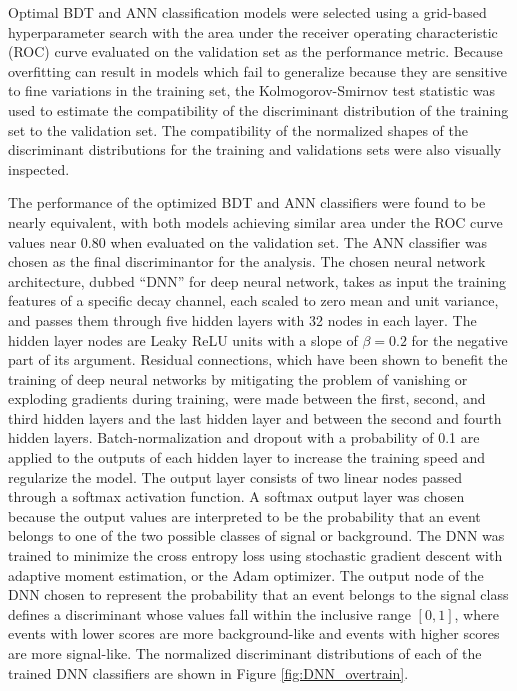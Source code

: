 Optimal BDT and ANN classification models were selected using a grid-based hyperparameter search with the area under the receiver operating characteristic (ROC) curve evaluated on the validation set as the performance metric. Because overfitting can result in models which fail to generalize because they are sensitive to fine variations in the training set, the Kolmogorov-Smirnov test statistic was used to estimate the compatibility of the discriminant distribution of the training set to the validation set. The compatibility of the normalized shapes of the discriminant distributions for the training and validations sets were also visually inspected.

The performance of the optimized BDT and ANN classifiers were found to be nearly equivalent, with both models achieving similar area under the ROC curve values near 0.80 when evaluated on the validation set. The ANN classifier was chosen as the final discriminantor for the analysis. The chosen neural network architecture, dubbed ``DNN'' for deep neural network, takes as input the training features of a specific decay channel, each scaled to zero mean and unit variance, and passes them through five hidden layers with 32 nodes in each layer. The hidden layer nodes are Leaky ReLU units with a slope of $\beta = 0.2$ for the negative part of its argument. Residual connections\cite{RESCONNECT}, which have been shown to benefit the training of deep neural networks by mitigating the problem of vanishing or exploding gradients during training, were made between the first, second, and third hidden layers and the last hidden layer and between the second and fourth hidden layers. Batch-normalization and dropout with a probability of 0.1 are applied to the outputs of each hidden layer to increase the training speed and regularize the model. The output layer consists of two linear nodes passed through a softmax activation function. A softmax output layer was chosen because the output values are interpreted to be the probability that an event belongs to one of the two possible classes of signal or background. The DNN was trained to minimize the cross entropy loss using stochastic gradient descent with adaptive moment estimation, or the Adam optimizer. The output node of the DNN chosen to represent the probability that an event belongs to the signal class defines a discriminant whose values fall within the inclusive range $[0, 1]$, where events with lower scores are more background-like and events with higher scores are more signal-like. The normalized discriminant distributions of each of the trained DNN classifiers are shown in Figure \ref{fig:DNN_overtrain}.

